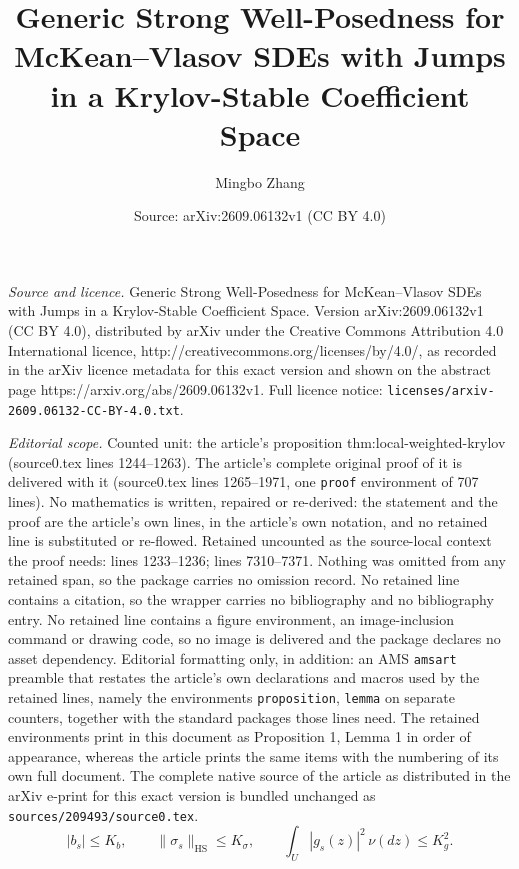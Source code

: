 \documentclass[10pt,a4paper]{amsart}
\title{Generic Strong Well-Posedness for McKean--Vlasov SDEs with Jumps in a Krylov-Stable Coefficient Space}
\author{Mingbo Zhang}
\date{Source: arXiv:2609.06132v1 (CC BY 4.0)}
\begin{document}
\maketitle

\noindent\emph{Source and licence.} Generic Strong Well-Posedness for McKean--Vlasov SDEs with Jumps in a Krylov-Stable Coefficient Space. Version arXiv:2609.06132v1 (CC BY 4.0), distributed by arXiv under the Creative Commons Attribution 4.0 International licence, http://creativecommons.org/licenses/by/4.0/, as recorded in the arXiv licence metadata for this exact version and shown on the abstract page https://arxiv.org/abs/2609.06132v1. Full licence notice: \texttt{licenses/arxiv-2609.06132-CC-BY-4.0.txt}.\par\smallskip

\noindent\textit{Editorial scope.} Counted unit: the article's proposition thm:local-weighted-krylov (source0.tex lines 1244--1263). The article's complete original proof of it is delivered with it (source0.tex lines 1265--1971, one \texttt{proof} environment of 707 lines). No mathematics is written, repaired or re-derived: the statement and the proof are the article's own lines, in the article's own notation, and no retained line is substituted or re-flowed.  Retained uncounted as the source-local context the proof needs: lines 1233--1236; lines 7310--7371.  Nothing was omitted from any retained span, so the package carries no omission record.  No retained line contains a citation, so the wrapper carries no bibliography and no bibliography entry.  No retained line contains a figure environment, an image-inclusion command or drawing code, so no image is delivered and the package declares no asset dependency.  Editorial formatting only, in addition: an AMS \texttt{amsart} preamble that restates the article's own declarations and macros used by the retained lines, namely the environments \texttt{proposition}, \texttt{lemma} on separate counters, together with the standard packages those lines need.  The retained environments print in this document as Proposition 1, Lemma 1 in order of appearance, whereas the article prints the same items with the numbering of its own full document.  The complete native source of the article as distributed in the arXiv e-print for this exact version is bundled unchanged as \texttt{sources/209493/source0.tex}.
	\begin{equation}
		\label{eq:ito-levy-uniform-bounds}
		|b_s|\le K_b,\qquad\|\sigma_s\|_{\mathrm{HS}}\le K_\sigma,\qquad	\int_U|g_s(z)|^2\,\nu(dz)\le K_g^2.
	\end{equation}
\end{document}
